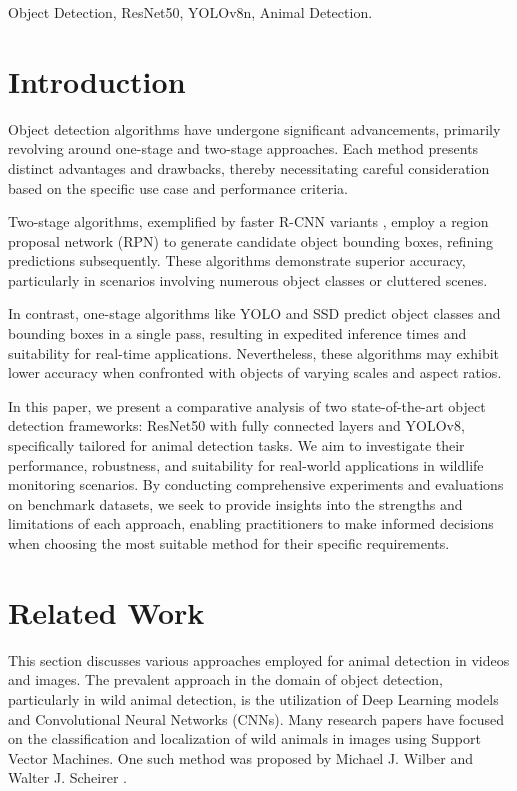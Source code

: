 \documentclass[conference]{IEEEtran}
\begin{document}
\begin{IEEEkeywords}
Object Detection, ResNet50, YOLOv8n, Animal Detection.
\end{IEEEkeywords}

\section{Introduction}
Object detection algorithms have undergone significant advancements, primarily revolving around one-stage and two-stage approaches. Each method presents distinct advantages and drawbacks, thereby necessitating careful consideration based on the specific use case and performance criteria.

Two-stage algorithms, exemplified by faster R-CNN variants \cite{ren2015faster}, employ a region proposal network (RPN) to generate candidate object bounding boxes, refining predictions subsequently. These algorithms demonstrate superior accuracy, particularly in scenarios involving numerous object classes or cluttered scenes.

In contrast, one-stage algorithms like YOLO \cite{redmon2016you} and SSD \cite{liu2016ssd} predict object classes and bounding boxes in a single pass, resulting in expedited inference times and suitability for real-time applications. Nevertheless, these algorithms may exhibit lower accuracy when confronted with objects of varying scales and aspect ratios.

In this paper, we present a comparative analysis of two state-of-the-art object detection frameworks: ResNet50 with fully connected layers and YOLOv8, specifically tailored for animal detection tasks. We aim to investigate their performance, robustness, and suitability for real-world applications in wildlife monitoring scenarios. By conducting comprehensive experiments and evaluations on benchmark datasets, we seek to provide insights into the strengths and limitations of each approach, enabling practitioners to make informed decisions when choosing the most suitable method for their specific requirements.

\section{Related Work}

This section discusses various approaches employed for animal detection in videos and images. The prevalent approach in the domain of object detection, particularly in wild animal detection, is the utilization of Deep Learning models and Convolutional Neural Networks (CNNs). Many research papers have focused on the classification and localization of wild animals in images using Support Vector Machines. One such method was proposed by Michael J. Wilber and Walter J. Scheirer \cite{wilber2013animal}.
\end{document}
